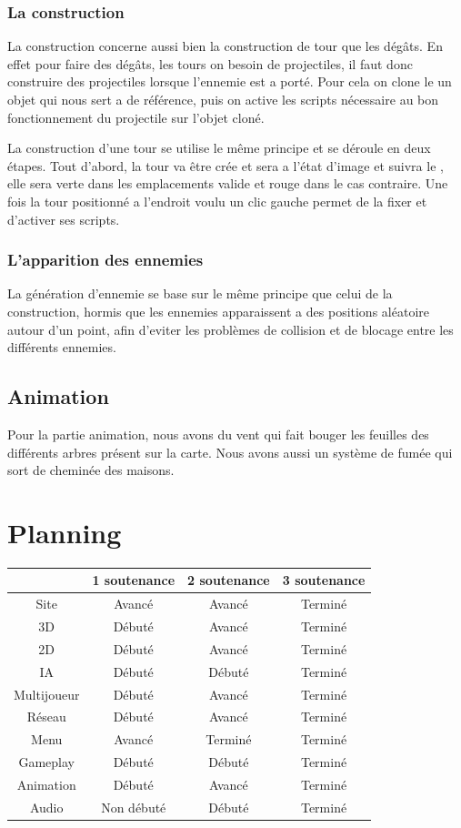 \documentclass[a4paper, 12pt]{article}
\begin{document}
		\subsubsection{La construction}
		La construction concerne aussi bien la construction de tour que les dégâts. En effet pour faire des dégâts, les tours on besoin de projectiles, il faut donc construire des projectiles lorsque l'ennemie est a porté. Pour cela on clone le un objet qui nous sert a de référence, puis on active les scripts nécessaire au bon fonctionnement du projectile sur l'objet cloné.
		\par La construction d'une tour se utilise le même principe et se déroule en deux étapes. Tout d'abord, la tour va être crée et sera a l'état d'image et suivra le , elle sera verte dans les emplacements valide et rouge dans le cas contraire. Une fois la tour positionné a l'endroit voulu un clic gauche permet de la fixer et d'activer ses scripts.
		\subsubsection{L'apparition des ennemies}
		La génération d'ennemie se base sur le même principe que celui de la construction, hormis que les ennemies apparaissent a des positions aléatoire autour d'un point, afin d'eviter les problèmes de collision et de blocage entre les différents ennemies. 
	\subsection{Animation}
	Pour la partie animation, nous avons du vent qui fait bouger les feuilles des différents arbres présent sur la carte.
Nous avons aussi un système de fumée qui sort de cheminée des maisons.

\newpage

\section{Planning}
	\begin{tabular}{|c||c|c|c|}
		\hline
		& 1\iere{} soutenance & 2\ieme{} soutenance & 3\ieme{} soutenance \\
		\hline
		Site &  Avancé & Avancé & Terminé \\
		\hline
		3D & Débuté & Avancé & Terminé \\
		\hline
		2D & Débuté & Avancé & Terminé \\
		\hline
		IA & Débuté & Débuté & Terminé\\
		\hline
		Multijoueur & Débuté & Avancé & Terminé\\
		\hline
		Réseau & Débuté & Avancé & Terminé\\
		\hline
		Menu & Avancé & Terminé & Terminé \\
		\hline
		Gameplay & Débuté & Débuté & Terminé\\
		\hline
		Animation & Débuté & Avancé & Terminé\\		
		\hline
		Audio & Non débuté & Débuté & Terminé\\
		\hline		
	\end{tabular}\\
	\newpage
\end{document}
